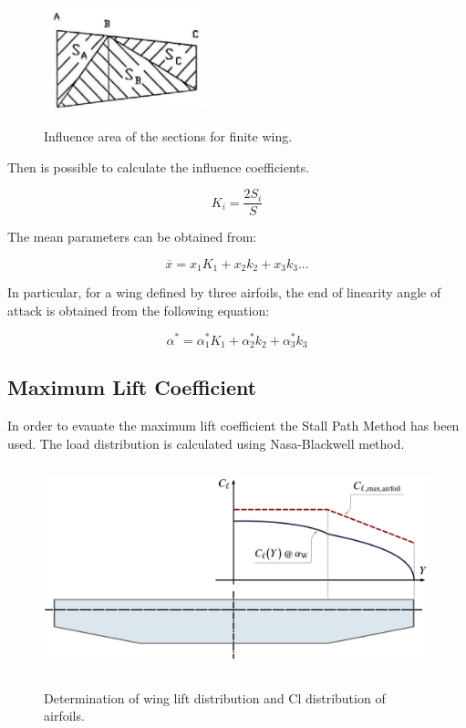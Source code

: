 \begin{figure}[H]
\centering
{\includegraphics[height=3cm]{Immagini/influencearea}} 
\caption{Influence area of the sections for finite wing.}
\label{fig:influencearea}
\end{figure}

Then is possible to calculate the influence coefficients. 

\begin{equation}
K_i = \frac{2 S_i}{S}
\end{equation}

The mean parameters can be obtained from:

\begin{equation}
\overline{x} = x_1 K_1 + x_2 k_2 +x_3 k_3...
\end{equation}

In particular, for a wing defined by three airfoils, the end of linearity angle of attack is obtained from the following equation:

\begin{equation}
\alpha^* = \alpha^*_{1} K_1 + \alpha^*_{2} k_2 +\alpha^*_{3} k_3
\end{equation}

\subsection{Maximum Lift Coefficient}

In order to evauate the maximum lift coefficient the Stall Path Method has been used. The load distribution is calculated using Nasa-Blackwell method.

\begin{figure}[H]
\centering
{\includegraphics[height=6cm]{Immagini/Loading_Stall_Path_A}} 
\caption{Determination of wing lift distribution and Cl distribution of airfoils.}
\label{fig:stall0}
\end{figure}




